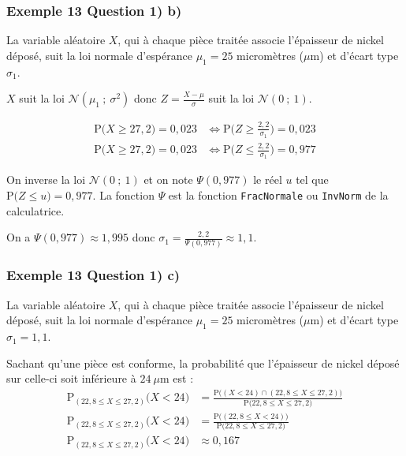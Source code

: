 \documentclass[xcolor=svgnames,t,final]{beamer}
\newcommand{\loinorm}[2]{\mathcal{N}\left(#1\ ; \ #2 \right)}
\newcommand{\proba}[1]{\text{P}\big(#1\big)}
\newcommand{\probacond}[2]{\text{P}_{#2}\big(#1\big)}
\begin{document}
\begin{frame}

\frametitle{Exemple 13 Question 1) b)}

La variable aléatoire $X$, qui à chaque pièce traitée associe l'épaisseur de nickel déposé, suit la loi normale d'espérance $\mu_1 = 25$ micromètres ($\mu$m) et d'écart type $\sigma_1$. 


$X$ suit la loi $\loinorm{\mu_{1}}{\sigma^{2}}$ donc $Z=\frac{X - \mu}{\sigma}$ suit la loi $\loinorm{0}{1}$.

\begin{align*}
\proba{ X \geqslant 27,2} = 0,023  & \Longleftrightarrow  \proba{ Z \geqslant \frac{2,2}{\sigma_{1}}} = 0,023 \\
\proba{ X \geqslant 27,2} = 0,023  & \Longleftrightarrow  \proba{ Z \leqslant \frac{2,2}{\sigma_{1}}} = 0,977
\end{align*}


On inverse la loi $\loinorm{0}{1}$ et on note $\Psi(0,977)$ le réel $u$ tel que $\proba{Z \leqslant u} = 0,977$.
La fonction $\Psi$ est la fonction \texttt{FracNormale} ou \texttt{InvNorm} de la calculatrice.

On a $\Psi(0,977) \approx 1,995$ donc $\boxed{\sigma_{1} = \frac{2,2}{\Psi(0,977)} \approx 1,1}$.


\end{frame}


\begin{frame}

\frametitle{Exemple 13 Question 1) c)}

La variable aléatoire $X$, qui à chaque pièce traitée associe l'épaisseur de nickel déposé, suit la loi normale d'espérance $\mu_1 = 25$ micromètres ($\mu$m) et d'écart type $\sigma_1=1,1$. 

Sachant qu’une pièce est conforme,  la probabilité que l'épaisseur de nickel déposé sur celle-ci soit inférieure à $24~\mu$m est :
\begin{align*}
\probacond{X < 24}{(22,8 \leqslant X \leqslant 27,2)} &= \frac{\proba{(X < 24) \cap (22,8 \leqslant X \leqslant 27,2)}}{\proba{22,8 \leqslant X \leqslant 27,2}} \\
\probacond{X < 24}{(22,8 \leqslant X \leqslant 27,2)} &= \frac{\proba{(22,8 \leqslant X < 24)}}{\proba{22,8 \leqslant X \leqslant 27,2}} \\
\probacond{X < 24}{(22,8 \leqslant X \leqslant 27,2)} &\boxed{\approx 0,167}
\end{align*}


\end{frame}
\end{document}
